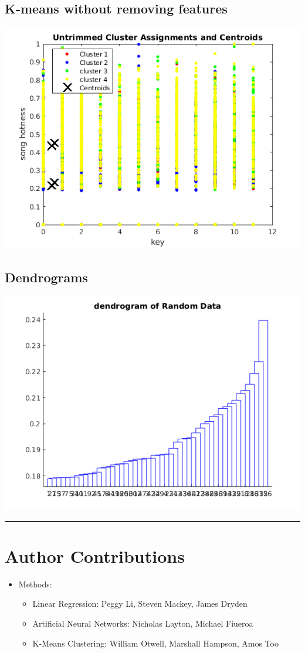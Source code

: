 \documentclass[12pt]{article}
\newcommand{\horizontalLine}{
	\begin{center}
		\hrule width 1.0\textwidth
	\end{center}
}
\begin{document}
\subsection{K-means without removing features}
\label{subsec:untrimmedKmeans}
\includegraphics[scale=0.6]{images/clustering/untrimmedkmeans}
\subsection{Dendrograms}
\label{subsec:dendrograms}
\includegraphics[scale=0.6]{images/clustering/h_random}
\horizontalLine
\section{Author Contributions}
\label{sec:authorContributions}
\begin{itemize}
    \item Methods:
    \begin{itemize}
        \item Linear Regression: Peggy Li, Steven Mackey, James Dryden
        \item Artificial Neural Networks: Nicholas Layton, Michael Fiueroa
        \item K-Means Clustering: William Otwell, Marshall Hampson, Amos Too
    \end{itemize}
\end{itemize}
\end{document}
